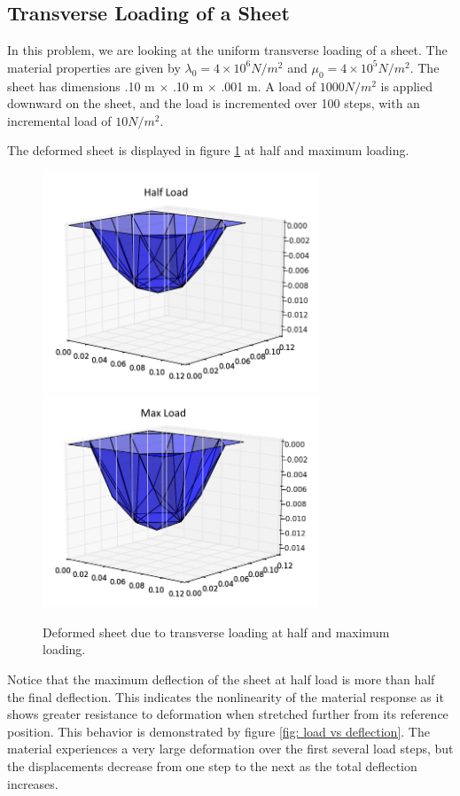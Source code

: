 \documentclass[]{spie}  %
\begin{document}
\subsection{Transverse Loading of a Sheet}
In this problem, we are looking at the uniform transverse loading of a sheet. The material properties are given by $\lambda_0 = 4 \times 10^6 N/m^2$ and $\mu_0 = 4 \times 10^5 N/m^2$. The sheet has dimensions .10 m $\times$ .10 m $\times$ .001 m. A load of $1000 N/m^2$ is applied downward on the sheet, and the load is incremented over 100 steps, with an incremental load of $10 N/m^2$. 

The deformed sheet is displayed in figure \ref{fig: transverse loading} at half and maximum loading. 
\begin{figure}[h]
	\centering
	\includegraphics[width=3.25in]{deformed_sheet_half_load.png} \quad
	\includegraphics[width=3.25in]{deformed_sheet_max_load.png} 
	\caption{Deformed sheet due to transverse loading at half and maximum loading.} 
	\label{fig: transverse loading}
\end{figure}
Notice that the maximum deflection of the sheet at half load is more than half the final deflection. This indicates the nonlinearity of the material response as it shows greater resistance to deformation when stretched further from its reference position. This behavior is demonstrated by figure \ref{fig: load vs deflection}. The material experiences a very large deformation over the first several load steps, but the displacements decrease from one step to the next as the total deflection increases. 
\end{document}
